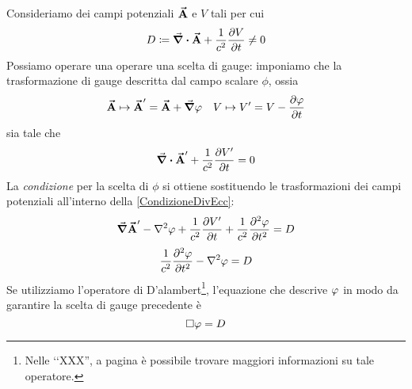 Consideriamo dei campi potenziali $\vb*{\va{A}}$ e $V$ tali per cui
\begin{equation*}
	D\coloneqq\div{\vb*{\va{A}}}+\frac{1}{c^2}\pdv{V}{t}\neq 0
\end{equation*}
Possiamo operare una operare una scelta di gauge: imponiamo che la trasformazione di gauge descritta dal campo scalare $\phi$, ossia
\begin{align*}
	\vba{A}\mapsto\vba{A}'=\vba{A}+\grad{\oldphi}&&
	V\mapsto V'=V-\pdv{\phi}{t}
\end{align*}
sia tale che
\begin{equation}
	\div{\vb*{\va{A}}'}+\frac{1}{c^2}\pdv{V'}{t}=0\label{CondizioneDivEcc}
\end{equation}
La \textit{condizione} per la scelta di $\phi$ si ottiene sostituendo le trasformazioni dei campi potenziali all'interno della \eqref{CondizioneDivEcc}:
\begin{equation*}
	\grad{\vba{A}'}-\laplacian{\oldphi}+\frac{1}{c^2}\pdv{V'}{t}+\frac{1}{c^2}\pdv[2]{\oldphi}{t}=D
\end{equation*}
\begin{equation}
	\frac{1}{c^2}\pdv[2]{\phi}{t}-\laplacian{\oldphi}=D
\end{equation}
Se utilizziamo l'operatore di D'alambert\footnote{Nelle ‘‘XXX'', a pagina \pageref{dalembertiano} è possibile trovare maggiori informazioni su tale operatore.}, l'equazione che descrive $\oldphi$ in modo da garantire la scelta di gauge precedente è
\begin{equation}
	\Box{\oldphi}=D
\end{equation}
